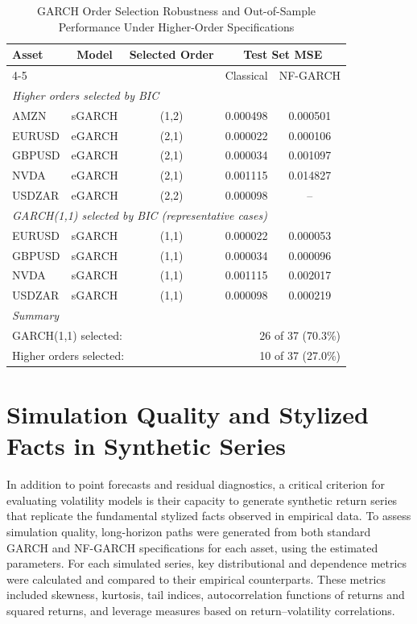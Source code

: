 \documentclass[oneside,12pt]{CUEDthesisPSnPDF}
\begin{document}
\clearpage
\begin{table}[h]
\centering
\caption{GARCH Order Selection Robustness and Out-of-Sample Performance Under Higher-Order Specifications}
\label{tab:garch_order_selection}
\small
\begin{tabular}{lcccc}
\toprule
\label{tab:garch_order_selection}
Asset & Model & Selected Order & \multicolumn{2}{c}{Test Set MSE} \\
\cmidrule(lr){4-5}
& & & Classical & NF-GARCH \\
\midrule
\multicolumn{5}{l}{\textit{Higher orders selected by BIC}} \\
\midrule
AMZN   & sGARCH & (1,2) & 0.000498 & 0.000501 \\
EURUSD & eGARCH & (2,1) & 0.000022 & 0.000106 \\
GBPUSD & eGARCH & (2,1) & 0.000034 & 0.001097 \\
NVDA   & eGARCH & (2,1) & 0.001115 & 0.014827 \\
USDZAR & eGARCH & (2,2) & 0.000098 & -- \\
\midrule
\multicolumn{5}{l}{\textit{GARCH(1,1) selected by BIC (representative cases)}} \\
\midrule
EURUSD & sGARCH & (1,1) & 0.000022 & 0.000053 \\
GBPUSD & sGARCH & (1,1) & 0.000034 & 0.000096 \\
NVDA   & sGARCH & (1,1) & 0.001115 & 0.002017 \\
USDZAR & sGARCH & (1,1) & 0.000098 & 0.000219 \\
\midrule
\multicolumn{5}{l}{\textit{Summary}} \\
\midrule
\multicolumn{3}{l}{GARCH(1,1) selected:} & \multicolumn{2}{r}{26 of 37 (70.3\%)} \\
\multicolumn{3}{l}{Higher orders selected:} & \multicolumn{2}{r}{10 of 37 (27.0\%)} \\
\bottomrule
\end{tabular}
\end{table}


\section{Simulation Quality and Stylized Facts in Synthetic Series}
\label{sec:simulation_quality}
\noindent
In addition to point forecasts and residual diagnostics, a critical criterion for evaluating volatility models is their capacity to generate synthetic return series that replicate the fundamental stylized facts observed in empirical data. To assess simulation quality, long-horizon paths were generated from both standard GARCH and NF-GARCH specifications for each asset, using the estimated parameters. For each simulated series, key distributional and dependence metrics were calculated and compared to their empirical counterparts. These metrics included skewness, kurtosis, tail indices, autocorrelation functions of returns and squared returns, and leverage measures based on return–volatility correlations.\\
\end{document}

